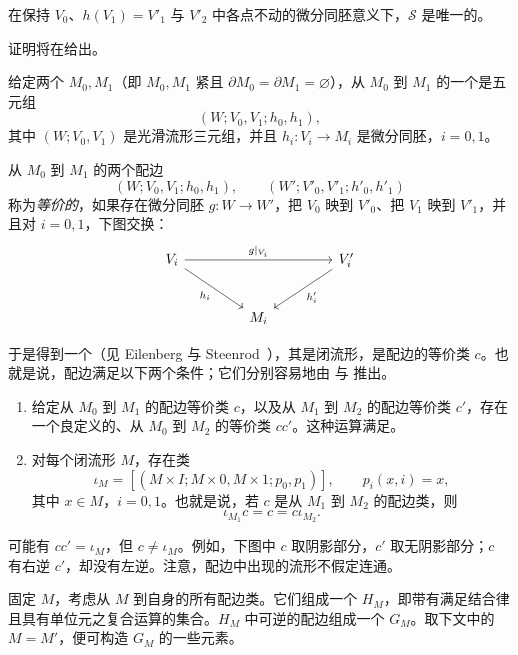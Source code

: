 在保持 $V_0$、$h(V_1)=V'_1$ 与 $V'_2$ 中各点不动的微分同胚意义下，$\mathcal S$ 是唯一的。

证明将在给出。

给定两个 $M_0,M_1$（即 $M_0,M_1$ 紧且 $\partial M_0=\partial M_1=\varnothing$），从 $M_0$ 到 $M_1$ 的一个\emph{}是五元组
\[
  (W;V_0,V_1;h_0,h_1),
\]
其中 $(W;V_0,V_1)$ 是光滑流形三元组，并且 $h_i:V_i\to M_i$ 是微分同胚，$i=0,1$。

从 $M_0$ 到 $M_1$ 的两个配边
\[
 (W;V_0,V_1;h_0,h_1),\qquad
 (W';V'_0,V'_1;h'_0,h'_1)
\]
称为\emph{等价的}，如果存在微分同胚 $g:W\to W'$，把 $V_0$ 映到 $V'_0$、把 $V_1$ 映到 $V'_1$，并且对 $i=0,1$，下图交换：
\[
\begin{tikzcd}[column sep=4.2em,row sep=2.5em]
  V_i \arrow[rr,"g|_{V_i}"] \arrow[dr,"h_i"']
  && V'_i \arrow[dl,"h'_i"] \\
  & M_i &
\end{tikzcd}
\]

于是得到一个（见 Eilenberg 与 Steenrod~\cite[p.~108]{ref02}），其是闭流形，是配边的等价类 $c$。也就是说，配边满足以下两个条件；它们分别容易地由 与 推出。
\begin{enumerate}[label=(\arabic*)]
  \item 给定从 $M_0$ 到 $M_1$ 的配边等价类 $c$，以及从 $M_1$ 到 $M_2$ 的配边等价类 $c'$，存在一个良定义的、从 $M_0$ 到 $M_2$ 的等价类 $cc'$。这种运算满足。
  \item 对每个闭流形 $M$，存在类
  \[
    \iota_M=[(M\times I;M\times0,M\times1;p_0,p_1)],
    \qquad p_i(x,i)=x,
  \]
  其中 $x\in M$，$i=0,1$。也就是说，若 $c$ 是从 $M_1$ 到 $M_2$ 的配边类，则
  \[
    \iota_{M_1}c=c=c\iota_{M_2}.
  \]
\end{enumerate}

可能有 $cc'=\iota_M$，但 $c\neq\iota_M$。例如，下图中 $c$ 取阴影部分，$c'$ 取无阴影部分；$c$ 有右逆 $c'$，却没有左逆。注意，配边中出现的流形不假定连通。
\begin{center}
  \FigOneShadow
\end{center}

固定 $M$，考虑从 $M$ 到自身的所有配边类。它们组成一个 $H_M$，即带有满足结合律且具有单位元之复合运算的集合。$H_M$ 中可逆的配边组成一个 $G_M$。取下文中的 $M=M'$，便可构造 $G_M$ 的一些元素。


